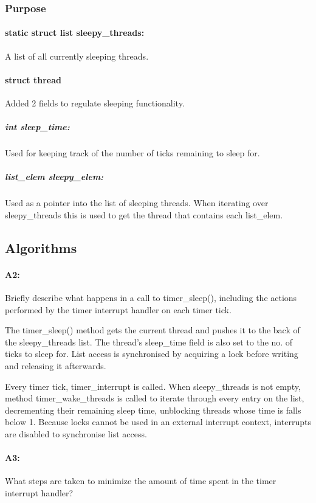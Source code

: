\documentclass[11pt]{article}
\begin{document}
\subsubsection{Purpose}
\paragraph{static struct list sleepy\_threads:}
A list of all currently sleeping threads.

\paragraph{struct thread}
Added 2 fields to regulate sleeping functionality.

\subparagraph{int sleep\_time:}
Used for keeping track of the number of ticks remaining to sleep for.
\subparagraph{list\_elem sleepy\_elem:}
Used as a pointer into the list of sleeping threads. When iterating over sleepy\_threads this is used to get the thread that contains each list\_elem.

\subsection{Algorithms}
\paragraph{A2:}
Briefly describe what happens in a call to timer\_sleep(), including the actions performed by the timer interrupt handler on each timer tick.

The timer\_sleep() method gets the current thread and pushes it to the back of the sleepy\_threads list. The thread's sleep\_time field is also set to the no. of ticks to sleep for. List access is synchronised by acquiring a lock before writing and releasing it afterwards.

Every timer tick, timer\_interrupt is called. When sleepy\_threads is not empty, method timer\_wake\_threads is called to iterate through every entry on the list, decrementing their remaining sleep time, unblocking threads whose time is falls below 1. Because locks cannot be used in an external interrupt context, interrupts are disabled to synchronise list access.

\paragraph{A3:}
What steps are taken to minimize the amount of time spent in the timer interrupt handler?
\end{document}
